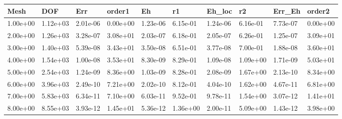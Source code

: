 \begin{tabular}{llllllllll}
Mesh & DOF & Err & order1 & Eh & r1 & Eh_loc & r2 & Err_Eh & order2 \\ 
\hline 
1.00e+00 & 1.12e+03 & 2.01e-06 & 0.00e+00 & 1.23e-06 & 6.15e-01 & 1.24e-06 & 6.16e-01 & 7.73e-07 & 0.00e+00 \\ 
2.00e+00 & 1.26e+03 & 3.28e-07 & 3.08e+01 & 2.03e-07 & 6.18e-01 & 2.05e-07 & 6.26e-01 & 1.25e-07 & 3.09e+01 \\ 
3.00e+00 & 1.40e+03 & 5.39e-08 & 3.43e+01 & 3.50e-08 & 6.51e-01 & 3.77e-08 & 7.00e-01 & 1.88e-08 & 3.60e+01 \\ 
4.00e+00 & 1.54e+03 & 1.00e-08 & 3.53e+01 & 8.30e-09 & 8.29e-01 & 1.09e-08 & 1.09e+00 & 1.71e-09 & 5.03e+01 \\ 
5.00e+00 & 2.54e+03 & 1.24e-09 & 8.36e+00 & 1.03e-09 & 8.28e-01 & 2.08e-09 & 1.67e+00 & 2.13e-10 & 8.34e+00 \\ 
6.00e+00 & 3.96e+03 & 2.49e-10 & 7.21e+00 & 2.02e-10 & 8.12e-01 & 4.04e-10 & 1.62e+00 & 4.67e-11 & 6.81e+00 \\ 
7.00e+00 & 5.83e+03 & 6.34e-11 & 7.10e+00 & 6.03e-11 & 9.52e-01 & 9.78e-11 & 1.54e+00 & 3.07e-12 & 1.41e+01 \\ 
8.00e+00 & 8.55e+03 & 3.93e-12 & 1.45e+01 & 5.36e-12 & 1.36e+00 & 2.00e-11 & 5.09e+00 & 1.43e-12 & 3.98e+00 \\ 
\hline 
\end{tabular}